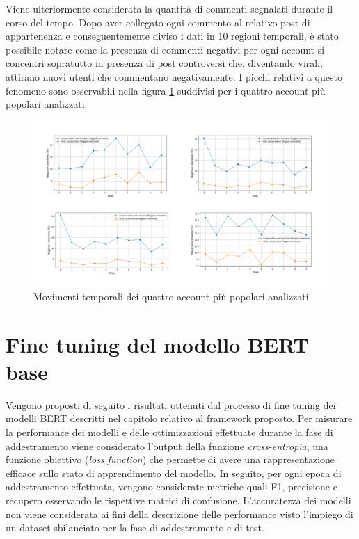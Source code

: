     
    Viene ulteriormente considerata la quantità di commenti segnalati durante il corso del tempo. Dopo aver collegato ogni commento al relativo post di appartenenza e conseguentemente diviso i dati in 10 regioni temporali, è stato possibile notare come la presenza di commenti negativi per ogni account si concentri sopratutto in presenza di post controversi che, diventando virali, attirano nuovi utenti che commentano negativamente. I picchi relativi a questo fenomeno sono osservabili nella figura \ref{fig:bins_total} suddivisi per i quattro account più popolari analizzati.
    
    \begin{figure}[h]
        \centering
        \includegraphics[width=1\textwidth]{pics/bins_comment-total.png}
        \caption{Movimenti temporali dei quattro account più popolari analizzati}
        \label{fig:bins_total}
    \end{figure}





\section{Fine tuning del modello BERT base}
Vengono proposti di seguito i risultati ottenuti dal processo di fine tuning dei modelli BERT descritti nel capitolo relativo al framework proposto. Per misurare la performance dei modelli e delle ottimizzazioni effettuate durante la fase di addestramento viene considerato l'output della funzione \textit{cross-entropia}, una funzione obiettivo (\textit{loss function}) che permette di avere una rappresentazione efficace sullo stato di apprendimento del modello. In seguito, per ogni epoca di addestramento effettuata, vengono considerate metriche quali F1, precisione e recupero osservando le rispettive matrici di confusione. L'accuratezza dei modelli non viene considerata ai fini della descrizione delle performance visto l'impiego di un dataset sbilanciato per la fase di addestramento e di test.


